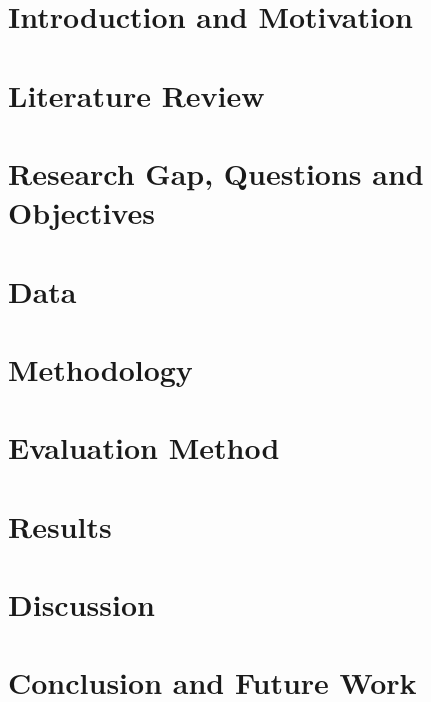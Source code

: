 \documentclass[12pt,a4paper]{srhthesis}
\begin{document}
\maketitle




\chapter{Introduction and Motivation}


\chapter{Literature Review}


\chapter{Research Gap, Questions and Objectives}


\chapter{Data}


\chapter{Methodology}


\chapter{Evaluation Method}


\chapter{Results}


\chapter{Discussion}


\chapter{Conclusion and Future Work}


\printbibliography[heading=bibintoc]
\end{document}
